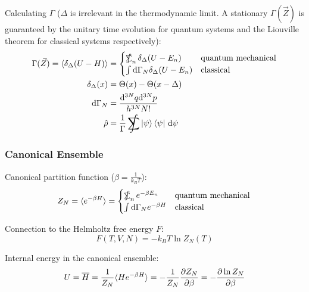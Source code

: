 			\noindent
			Calculating $\Gamma$ ($\Delta$ is irrelevant in the thermodynamic limit. A stationary $\Gamma(\vec{Z})$ is guaranteed by the unitary time evolution for quantum systems and the Liouville theorem for classical systems respectively):
			\begin{equation}
				\begin{aligned}
					\Gamma(\vec{Z}) = \langle \delta_\Delta (U-H) \rangle
						&= \begin{cases}
								\SumInt_n \delta_\Delta(U-E_n) & \text{quantum mechanical} \\
								\int \dd \Gamma_N \delta_\Delta(U-E_n) & \text{classical}
							\end{cases} \\
					\delta_\Delta(x) &= \Theta(x) - \Theta(x-\Delta)\\
					\dd \Gamma_N &= \frac{\dd^{3N}q \dd^{3N}p }{h^{3N} N!} \\
					\hat{\rho} &= \frac{1}{\Gamma} \SumInt \Ket{\psi}\Bra{\psi}\,\dd\psi
				\end{aligned}
			\end{equation}

		\subsubsection{Canonical Ensemble}
			\noindent
			Canonical partition function ($\beta = \frac{1}{k_B T}$):
			\begin{equation}
				Z_N=\langle e^{-\beta H} \rangle
					= \begin{cases}
							\SumInt_n e^{-\beta E_n} & \text{quantum mechanical} \\
							\int \dd \Gamma_N e^{-\beta H} & \text{classical}
						\end{cases} \\
			\end{equation}

			\noindent
			Connection to the Helmholtz free energy $F$:
			\begin{equation}
				F(T, V, N) = -k_B T \ln{Z_N(T)}
			\end{equation}


			\noindent
			Internal energy in the canonical ensemble:
			\begin{equation}
				U = \overline{H} = \frac{1}{Z_N}\langle He^{-\beta H}\rangle = -\frac{1}{Z_N}\frac{\partial Z_N}{\partial \beta} = -\frac{\partial \ln Z_N}{\partial \beta}
			\end{equation}

